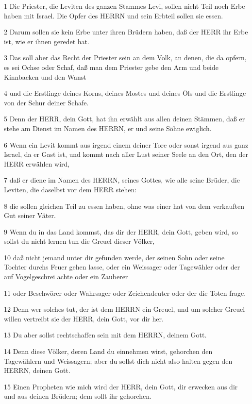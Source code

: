\par 1 Die Priester, die Leviten des ganzen Stammes Levi, sollen nicht Teil noch Erbe haben mit Israel. Die Opfer des HERRN und sein Erbteil sollen sie essen.
\par 2 Darum sollen sie kein Erbe unter ihren Brüdern haben, daß der HERR ihr Erbe ist, wie er ihnen geredet hat.
\par 3 Das soll aber das Recht der Priester sein an dem Volk, an denen, die da opfern, es sei Ochse oder Schaf, daß man dem Priester gebe den Arm und beide Kinnbacken und den Wanst
\par 4 und die Erstlinge deines Korns, deines Mostes und deines Öls und die Erstlinge von der Schur deiner Schafe.
\par 5 Denn der HERR, dein Gott, hat ihn erwählt aus allen deinen Stämmen, daß er stehe am Dienst im Namen des HERRN, er und seine Söhne ewiglich.
\par 6 Wenn ein Levit kommt aus irgend einem deiner Tore oder sonst irgend aus ganz Israel, da er Gast ist, und kommt nach aller Lust seiner Seele an den Ort, den der HERR erwählen wird,
\par 7 daß er diene im Namen des HERRN, seines Gottes, wie alle seine Brüder, die Leviten, die daselbst vor dem HERR stehen:
\par 8 die sollen gleichen Teil zu essen haben, ohne was einer hat von dem verkauften Gut seiner Väter.
\par 9 Wenn du in das Land kommst, das dir der HERR, dein Gott, geben wird, so sollst du nicht lernen tun die Greuel dieser Völker,
\par 10 daß nicht jemand unter dir gefunden werde, der seinen Sohn oder seine Tochter durchs Feuer gehen lasse, oder ein Weissager oder Tagewähler oder der auf Vogelgeschrei achte oder ein Zauberer
\par 11 oder Beschwörer oder Wahrsager oder Zeichendeuter oder der die Toten frage.
\par 12 Denn wer solches tut, der ist dem HERRN ein Greuel, und um solcher Greuel willen vertreibt sie der HERR, dein Gott, vor dir her.
\par 13 Du aber sollst rechtschaffen sein mit dem HERRN, deinem Gott.
\par 14 Denn diese Völker, deren Land du einnehmen wirst, gehorchen den Tagewählern und Weissagern; aber du sollst dich nicht also halten gegen den HERRN, deinen Gott.
\par 15 Einen Propheten wie mich wird der HERR, dein Gott, dir erwecken aus dir und aus deinen Brüdern; dem sollt ihr gehorchen.
